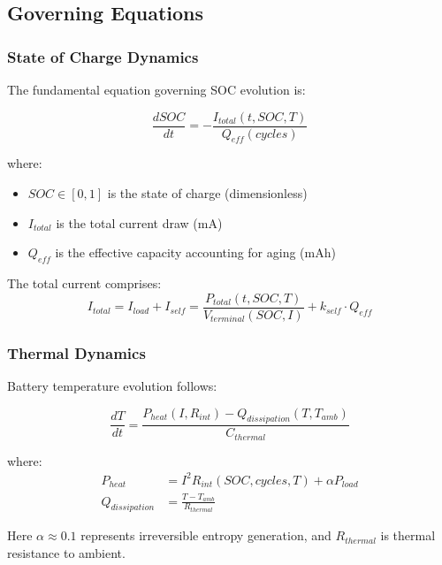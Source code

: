 \documentclass[12pt]{article}
\begin{document}
\subsection{Governing Equations}

\subsubsection{State of Charge Dynamics}

The fundamental equation governing SOC evolution is:

\begin{equation}
\frac{dSOC}{dt} = -\frac{I_{total}(t, SOC, T)}{Q_{eff}(cycles)}
\label{eq:soc}
\end{equation}

where:
\begin{itemize}
\item $SOC \in [0,1]$ is the state of charge (dimensionless)
\item $I_{total}$ is the total current draw (mA)
\item $Q_{eff}$ is the effective capacity accounting for aging (mAh)
\end{itemize}

The total current comprises:
\begin{equation}
I_{total} = I_{load} + I_{self} = \frac{P_{total}(t, SOC, T)}{V_{terminal}(SOC, I)} + k_{self} \cdot Q_{eff}
\label{eq:current}
\end{equation}

\subsubsection{Thermal Dynamics}

Battery temperature evolution follows:

\begin{equation}
\frac{dT}{dt} = \frac{P_{heat}(I, R_{int}) - Q_{dissipation}(T, T_{amb})}{C_{thermal}}
\label{eq:thermal}
\end{equation}

where:
\begin{align}
P_{heat} &= I^2 R_{int}(SOC, cycles, T) + \alpha P_{load} \\
Q_{dissipation} &= \frac{T - T_{amb}}{R_{thermal}}
\end{align}

Here $\alpha \approx 0.1$ represents irreversible entropy generation, and $R_{thermal}$ is thermal resistance to ambient.
\end{document}
